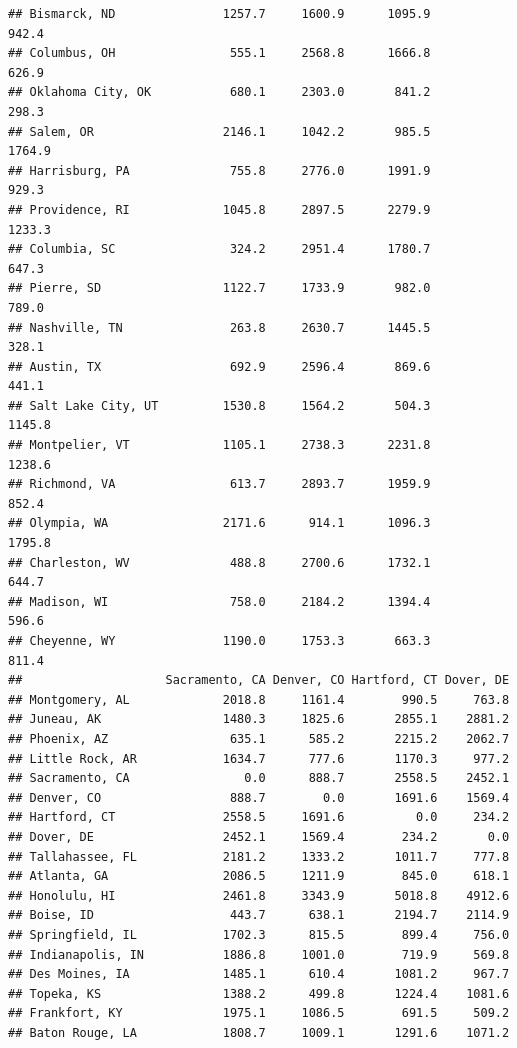 \documentclass[
]{article}
\begin{document}
\begin{verbatim}
## Bismarck, ND               1257.7     1600.9      1095.9           942.4
## Columbus, OH                555.1     2568.8      1666.8           626.9
## Oklahoma City, OK           680.1     2303.0       841.2           298.3
## Salem, OR                  2146.1     1042.2       985.5          1764.9
## Harrisburg, PA              755.8     2776.0      1991.9           929.3
## Providence, RI             1045.8     2897.5      2279.9          1233.3
## Columbia, SC                324.2     2951.4      1780.7           647.3
## Pierre, SD                 1122.7     1733.9       982.0           789.0
## Nashville, TN               263.8     2630.7      1445.5           328.1
## Austin, TX                  692.9     2596.4       869.6           441.1
## Salt Lake City, UT         1530.8     1564.2       504.3          1145.8
## Montpelier, VT             1105.1     2738.3      2231.8          1238.6
## Richmond, VA                613.7     2893.7      1959.9           852.4
## Olympia, WA                2171.6      914.1      1096.3          1795.8
## Charleston, WV              488.8     2700.6      1732.1           644.7
## Madison, WI                 758.0     2184.2      1394.4           596.6
## Cheyenne, WY               1190.0     1753.3       663.3           811.4
##                    Sacramento, CA Denver, CO Hartford, CT Dover, DE
## Montgomery, AL             2018.8     1161.4        990.5     763.8
## Juneau, AK                 1480.3     1825.6       2855.1    2881.2
## Phoenix, AZ                 635.1      585.2       2215.2    2062.7
## Little Rock, AR            1634.7      777.6       1170.3     977.2
## Sacramento, CA                0.0      888.7       2558.5    2452.1
## Denver, CO                  888.7        0.0       1691.6    1569.4
## Hartford, CT               2558.5     1691.6          0.0     234.2
## Dover, DE                  2452.1     1569.4        234.2       0.0
## Tallahassee, FL            2181.2     1333.2       1011.7     777.8
## Atlanta, GA                2086.5     1211.9        845.0     618.1
## Honolulu, HI               2461.8     3343.9       5018.8    4912.6
## Boise, ID                   443.7      638.1       2194.7    2114.9
## Springfield, IL            1702.3      815.5        899.4     756.0
## Indianapolis, IN           1886.8     1001.0        719.9     569.8
## Des Moines, IA             1485.1      610.4       1081.2     967.7
## Topeka, KS                 1388.2      499.8       1224.4    1081.6
## Frankfort, KY              1975.1     1086.5        691.5     509.2
## Baton Rouge, LA            1808.7     1009.1       1291.6    1071.2

\end{verbatim}
\end{document}
